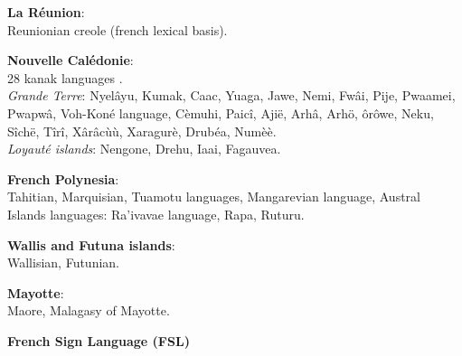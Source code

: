 \begin{multicols}{2}
{\bf La Réunion}:\\
Reunionian creole  (french lexical basis).

{\bf Nouvelle Calédonie}:\\
28 kanak languages .\\
{\em Grande Terre}: Nyelâyu, Kumak, Caac, Yuaga, Jawe, Nemi, Fwâi, Pije, Pwaamei, Pwapwâ, Voh-Koné language, Cèmuhi, Paicî, Ajië, Arhâ, Arhö, ôrôwe, Neku, Sîchë, Tîrî, Xârâcùù, Xaragurè, Drubéa, Numèè. \\
{\em Loyauté islands}: Nengone, Drehu, Iaai, Fagauvea.

{\bf French Polynesia}:\\
Tahitian, Marquisian, Tuamotu languages, Mangarevian language, Austral Islands languages: Ra'ivavae language, Rapa, Ruturu.

{\bf Wallis and Futuna islands}:\\
Wallisian, Futunian.

{\bf Mayotte}:\\
Maore, Malagasy of Mayotte.

{\bf French Sign Language (FSL)}\\

\end{multicols}

\clearpage


